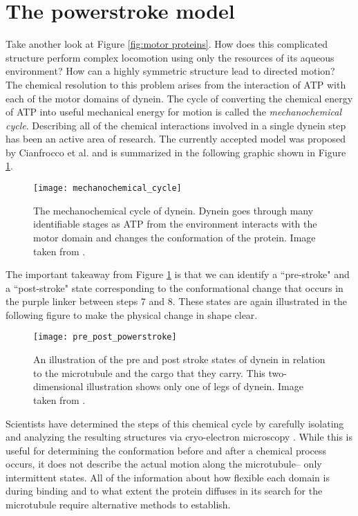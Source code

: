 \section{The powerstroke model} 
Take another look at Figure \ref{fig:motor proteins}. How does this complicated structure perform complex locomotion using only the resources of its aqueous environment? How can a highly symmetric structure lead to directed motion? The chemical resolution to this problem arises from the interaction of ATP with each of the motor domains of dynein. The cycle of converting the chemical energy of  ATP into useful mechanical energy for motion is called the \textit{mechanochemical cycle}\cite{cianfrocco2015mechanism}. Describing all of the chemical interactions involved in a single dynein step has been an active area of research. The currently accepted model was proposed by Cianfrocco et al. and is summarized in the following graphic shown in Figure \ref{fig:mechanochemical_cycle}. 

\begin{figure}[!hbt]
	\centering
	\texttt{[image: mechanochemical\_cycle]}
	\caption{The mechanochemical cycle of dynein. Dynein goes through many identifiable stages as ATP from the environment interacts with the motor domain and changes the conformation of the protein. Image taken from \cite{cianfrocco2015mechanism}.}
	\label{fig:mechanochemical_cycle}
\end{figure}

The important takeaway from Figure \ref{fig:mechanochemical_cycle} is that we can identify a ``pre-stroke" and a ``post-stroke" state corresponding to the conformational change that occurs in the purple linker between steps 7 and 8. These states are again illustrated in the following figure to make the physical change in shape clear. 

\begin{figure}[!hbt]
	\centering
	\texttt{[image: pre\_post\_powerstroke]}
	\caption{An illustration of the pre and post stroke states of dynein in relation to the microtubule and the cargo that they carry. This two-dimensional illustration shows only one of legs of dynein. Image taken from \cite{lin2014structural}.}
\end{figure}

Scientists have determined the steps of this chemical cycle by carefully isolating and analyzing the resulting structures via cryo-electron microscopy \cite{burgess2003dynein}. While this is useful for determining the conformation before and after a chemical process occurs, it does not describe the actual motion along the microtubule-- only intermittent states. All of the information about how flexible each domain is during binding and to what extent the protein diffuses in its search for the microtubule require alternative methods to establish.

